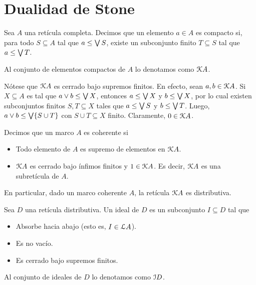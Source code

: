 \section{Dualidad de Stone}

\begin{definition}
    Sea $A$ una retícula completa.
    Decimos que un elemento $a\in A$ es compacto si,
    para todo $S\subseteq A$ tal que $a\leq\Sup S$,
    existe un subconjunto finito $T\subseteq S$ tal que
    $a\leq\Sup T$.
    
    Al conjunto de elementos compactos
    de $A$ lo denotamos como $\cal KA$.
\end{definition}

Nótese que $\cal KA$ es cerrado bajo supremos finitos.
En efecto, sean $a,b\in\cal KA$.
Si $X\subseteq A$ es tal que $a\sup b\leq\Sup X$,
entonces $a\leq\Sup X$ y $b\leq\Sup X$, por lo cual
existen subconjuntos finitos $S,T\subseteq X$
tales que $a\leq\Sup S$ y $b\leq\Sup T$.
Luego, $a\sup b\leq\Sup\{S\cup T\}$ con $S\cup T\subseteq X$ finito.
Claramente, $0\in\cal KA$.

\begin{definition}
    Decimos que un marco $A$ es coherente si
    \begin{itemize}
        \item Todo elemento de $A$ es supremo de elementos
        en $\cal KA$.
        \item $\cal KA$ es cerrado bajo ínfimos finitos
        y $1\in\cal KA$.
        Es decir, $\cal KA$ es una subretícula de $A$.
    \end{itemize}
    En particular, dado un marco coherente $A$, la retícula
    $\cal KA$ es distributiva.
\end{definition}

\begin{definition}
    Sea $D$ una retícula distributiva.
    Un ideal de $D$ es un subconjunto $I\subseteq D$ tal que
    \begin{itemize}
        \item Absorbe hacia abajo (esto es, $I\in\cal LA$).
        \item Es no vacío.
        \item Es cerrado bajo supremos finitos.
    \end{itemize}
    Al conjunto de ideales de $D$ lo denotamos como $\cal ID$.
\end{definition}

